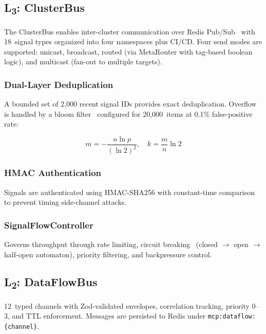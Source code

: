 \documentclass[journal,10pt]{IEEEtran}
\newcommand{\code}[1]{\texttt{#1}}
\newcommand{\layerthree}{L\textsubscript{3}}
\newcommand{\layertwo}{L\textsubscript{2}}
\begin{document}
\subsection{\layerthree: ClusterBus}
\label{sec:l3}

The ClusterBus enables inter-cluster communication over Redis Pub/Sub~\cite{redis} with 18~signal types organized into four namespaces plus CI/CD. Four send modes are supported: unicast, broadcast, routed (via MetaRouter with tag-based boolean logic), and multicast (fan-out to multiple targets).

\subsubsection{Dual-Layer Deduplication}

A bounded set of 2{,}000 recent signal IDs provides exact deduplication. Overflow is handled by a bloom filter~\cite{bloom1970} configured for 20{,}000~items at 0.1\% false-positive rate:

\begin{equation}
m = -\frac{n \ln p}{(\ln 2)^2}, \quad k = \frac{m}{n} \ln 2
\label{eq:bloom}
\end{equation}

\subsubsection{HMAC Authentication}

Signals are authenticated using HMAC-SHA256 with constant-time comparison to prevent timing side-channel attacks.

\subsubsection{SignalFlowController}

Governs throughput through rate limiting, circuit breaking~\cite{nygard2007} (closed $\to$ open $\to$ half-open automaton), priority filtering, and backpressure control.

\subsection{\layertwo: DataFlowBus}
\label{sec:l2}

12~typed channels with Zod-validated envelopes, correlation tracking, priority 0--3, and TTL enforcement. Messages are persisted to Redis under \code{mcp:dataflow:\{channel\}}.
\end{document}
